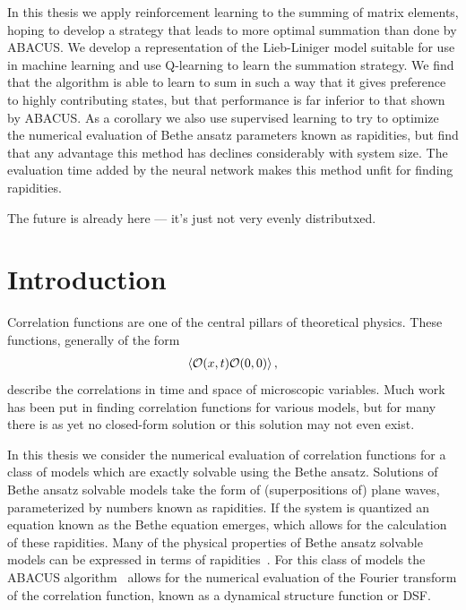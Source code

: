 \documentclass[11pt, a4paper]{report} %
\begin{document}
In this thesis we apply reinforcement learning to the summing of matrix elements, hoping to develop a strategy that leads to more optimal summation than done by ABACUS.
We develop a representation of the Lieb-Liniger model suitable for use in machine learning and use Q-learning to learn the summation strategy.
We find that the algorithm is able to learn to sum in such a way that it gives preference to highly contributing states, but that performance is far inferior to that shown by ABACUS.
As a corollary we also use supervised learning to try to optimize the numerical evaluation of Bethe ansatz parameters known as rapidities, but find that any advantage this method has declines considerably with system size.
The evaluation time added by the neural network makes this method unfit for finding rapidities.

\begin{savequote}[50mm]
The future is already here --- it's just not very evenly distributxed.
\end{savequote}


\chapter{Introduction}


\noindent
Correlation functions are one of the central pillars of theoretical physics.
These functions, generally of the form
\begin{align}
  \label{eq:55}
  \expval{\mathcal{O}(x,t)\mathcal{O}(0,0)},
\end{align}
describe the correlations in time and space of microscopic variables.
Much work has been put in finding correlation functions for various models, but for many there is as yet no closed-form solution or this solution may not even exist.

In this thesis we consider the numerical evaluation of correlation functions for a class of models which are exactly solvable using the Bethe ansatz.
Solutions of Bethe ansatz solvable models take the form of (superpositions of) plane waves, parameterized by numbers known as rapidities.
If the system is quantized an equation known as the Bethe equation emerges, which allows for the calculation of these rapidities.
Many of the physical properties of Bethe ansatz solvable models can be expressed in terms of rapidities~\cite{Korepin1993}.
For this class of models the ABACUS algorithm~\cite{Caux2009} allows for the numerical evaluation of the Fourier transform of the correlation function, known as a dynamical structure function or DSF.
\end{document}
